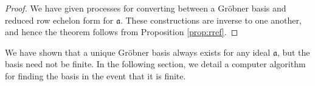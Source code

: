 \begin{proof}
	We have given processes for converting between a Gr\"obner basis and reduced row echelon form for $\mathfrak{a}$. These constructions are inverse to one another, and hence the theorem follows from Proposition \ref{prop:rref}.
\end{proof}
We have shown that a unique Gr\"obner basis always exists for any ideal $\mathfrak{a}$, but the basis need not be finite. In the following section, we detail a computer algorithm for finding the basis in the event that it is finite.
